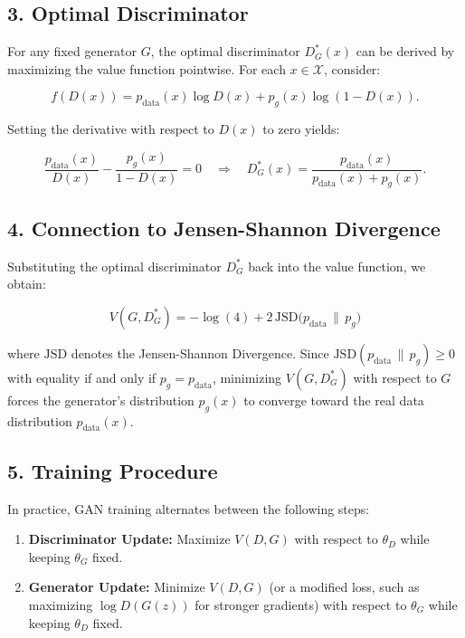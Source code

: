 \documentclass{article}
\begin{document}
\subsection*{3. Optimal Discriminator}

For any fixed generator $ G $, the optimal discriminator $ D^*_G(x) $ can be derived by maximizing the value function pointwise. For each $ x \in \mathcal{X} $, consider:

\[
f(D(x)) = p_{\text{data}}(x) \log D(x) + p_g(x) \log (1 - D(x)).
\]

Setting the derivative with respect to $ D(x) $ to zero yields:

\begin{equation}
\frac{p_{\text{data}}(x)}{D(x)} - \frac{p_g(x)}{1-D(x)} = 0 \quad \Longrightarrow \quad D^*_G(x) = \frac{p_{\text{data}}(x)}{p_{\text{data}}(x) + p_g(x)}.
\end{equation}

\subsection*{4. Connection to Jensen-Shannon Divergence}

Substituting the optimal discriminator $ D^*_G $ back into the value function, we obtain:

\begin{equation}
    V(G, D^*_G) = -\log(4) + 2\, \mathrm{JSD}\big(p_{\text{data}} \,\|\, p_g\big)
\end{equation}

where $ \mathrm{JSD} $ denotes the Jensen-Shannon Divergence. Since $ \mathrm{JSD}(p_{\text{data}} \,\|\, p_g) \geq 0 $ with equality if and only if $ p_g = p_{\text{data}} $, minimizing $ V(G, D^*_G) $ with respect to $ G $ forces the generator’s distribution $ p_g(x) $ to converge toward the real data distribution $ p_{\text{data}}(x) $.

\subsection*{5. Training Procedure}

In practice, GAN training alternates between the following steps:
\begin{enumerate}
    \item \textbf{Discriminator Update:}
    Maximize $ V(D, G) $ with respect to $ \theta_D $ while keeping $ \theta_G $ fixed.

    \item \textbf{Generator Update:}
    Minimize $ V(D, G) $ (or a modified loss, such as maximizing $ \log D(G(z)) $ for stronger gradients) with respect to $ \theta_G $ while keeping $ \theta_D $ fixed.
\end{enumerate}
\end{document}
